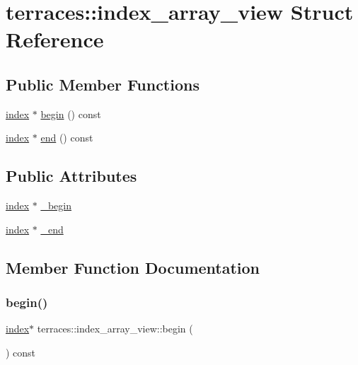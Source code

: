 \hypertarget{structterraces_1_1index__array__view}{}\section{terraces\+:\+:index\+\_\+array\+\_\+view Struct Reference}
\label{structterraces_1_1index__array__view}
\subsection*{Public Member Functions}
\begin{DoxyCompactItemize}
\item 
\hyperlink{namespaceterraces_adbc33ccb543d1634e96d0eb02e472c77}{index} $\ast$ \hyperlink{structterraces_1_1index__array__view_af05408fd685cc32bb368eb8573b0c98d}{begin} () const
\item 
\hyperlink{namespaceterraces_adbc33ccb543d1634e96d0eb02e472c77}{index} $\ast$ \hyperlink{structterraces_1_1index__array__view_aeea66f3e774d119b6be5d473f822568f}{end} () const
\end{DoxyCompactItemize}
\subsection*{Public Attributes}
\begin{DoxyCompactItemize}
\item 
\hyperlink{namespaceterraces_adbc33ccb543d1634e96d0eb02e472c77}{index} $\ast$ \hyperlink{structterraces_1_1index__array__view_a0ebf54edfffe71f8771fb7f77dcb811e}{\+\_\+begin}
\item 
\hyperlink{namespaceterraces_adbc33ccb543d1634e96d0eb02e472c77}{index} $\ast$ \hyperlink{structterraces_1_1index__array__view_ad12ad0aa47e15385e01b5b993de729e2}{\+\_\+end}
\end{DoxyCompactItemize}


\subsection{Member Function Documentation}
\mbox{\label{structterraces_1_1index__array__view_af05408fd685cc32bb368eb8573b0c98d}} 
\subsubsection{\texorpdfstring{begin()}{begin()}}
{\footnotesize\ttfamily \hyperlink{namespaceterraces_adbc33ccb543d1634e96d0eb02e472c77}{index}$\ast$ terraces\+::index\+\_\+array\+\_\+view\+::begin (\begin{DoxyParamCaption}{ }\end{DoxyParamCaption}) const\hspace{0.3cm}{\ttfamily [inline]}}

